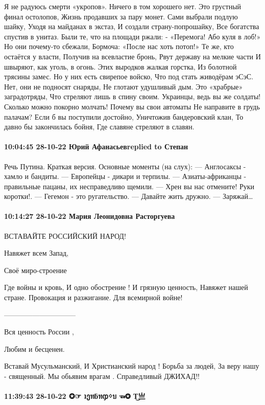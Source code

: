 Я не радуюсь смерти «укропов».
Ничего в том хорошего нет.
Это грустный финал остолопов,
Жизнь продавших за пару монет.
Сами выбрали подлую шайку,
Уходя на майданах в экстаз,
И создали страну-попрошайку,
Все богатства спустив в унитаз.
Были те, что на площади ржали:
- «Перемога! Або куля в лоб!»
Но они почему-то сбежали,
Бормоча: «После нас хоть потоп!»
Те же, кто остаётся у власти,
Получив на всевластие бронь,
Рвут державу на мелкие части
И швыряют, как уголь, в огонь.
Этих выродков жалкая горстка,
Из болотной трясины замес.
Но у них есть свирепое войско,
Что под стать живодёрам эСэС.
Нет, они не подносят снаряды,
Не глотают удушливый дым.
Это «храбрые» заградотряды,
Что стреляют лишь в спину своим.
Украинцы, ведь вы же солдаты!
Сколько можно покорно молчать!
Почему вы свои автоматы
Не направите в грудь палачам?
Если б вы поступили достойно,
Уничтожив бандеровский клан,
То давно бы закончилась бойня,
Где славяне стреляют в славян.

\paragraph{10:04:45 28-10-22 Юрий Афанасьевreplied to Степан}

Речь Путина. Краткая версия.
Основные моменты (на слух):
— Англосаксы - хамло и бандиты.
— Европейцы - дикари и терпилы.
— Азиаты-африканцы - правильные пацаны, их несправедливо щемили.
— Хрен вы нас отмените! Руки коротки!.
— Гегемон - это ругательство.
— Давайте жить дружно.
— Заряжай…

\paragraph{10:14:27 28-10-22 Мария Леонидовна Расторгуева}

ВСТАВАЙТЕ РОССИЙСКИЙ НАРОД!

Навяжет всем Запад,

Своё миро-строение

Где войны и кровь,
И одно обострение !
И грязную ценность,
Навяжет нашей стране.
Провокация и разжигание.
Для всемирной войне!

------------------------------

Вся ценность России ,

Любим и бесценен.

Вставай Мусульманский,
И Христианский народ !
Борьба за людей,
За веру нашу - священный.
Мы обьявим врагам .
Справедливый ДЖИХАД!!

\paragraph{11:39:43 28-10-22 ✪☞ ʇეทƃทჶᛜบ ☜✪ T͜亗}

